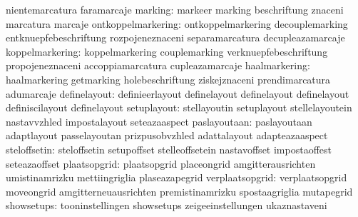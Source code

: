                                   nientemarcatura                  faramarcaje
                         marking: markeer                          marking
                                  beschriftung                     znaceni
                                  marcatura                        marcaje
              ontkoppelmarkering: ontkoppelmarkering               decouplemarking
                                  entknuepfebeschriftung           rozpojeneznaceni
                                  separamarcatura                  decupleazamarcaje %
                 koppelmarkering: koppelmarkering                  couplemarking
                                  verknuepfebeschriftung           propojeneznaceni
                                  accoppiamarcatura                cupleazamarcaje %
                   haalmarkering: haalmarkering                    getmarking
                                  holebeschriftung                 ziskejznaceni
                                  prendimarcatura                  adumarcaje %
                    definelayout: definieerlayout                  definelayout
                                  definelayout                     definelayout
                                  definiscilayout                  definelayout %
                     setuplayout: stellayoutin                     setuplayout
                                  stellelayoutein                  nastavvzhled
                                  impostalayout                    seteazaaspect
                    paslayoutaan: paslayoutaan                     adaptlayout
                                  passelayoutan                    prizpusobvzhled
                                  adattalayout                     adapteazaaspect
                    steloffsetin: steloffsetin                     setupoffset
                                  stelleoffsetein                  nastavoffset
                                  impostaoffest                    seteazaoffset
                    plaatsopgrid: plaatsopgrid                     placeongrid
                                  amgitterausrichten               umistinamrizku
                                  mettiingriglia                   plaseazapegrid
                 verplaatsopgrid: verplaatsopgrid                  moveongrid
                                  amgitterneuausrichten            premistinamrizku
                                  spostaagriglia                   mutapegrid
                      showsetups: tooninstellingen                 showsetups
                                  zeigeeinstellungen               ukaznastaveni
